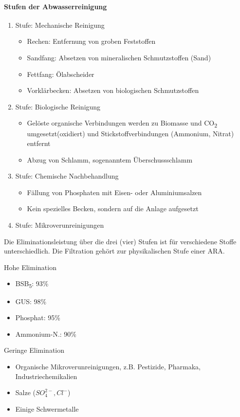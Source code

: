 \documentclass[9pt, openright=false]{scrartcl}
\begin{document}
\paragraph{Stufen der Abwasserreinigung} 
\begin{enumerate}
\item Stufe: Mechanische Reinigung
\begin{itemize}
\item Rechen: Entfernung von groben Feststoffen
\item Sandfang: Absetzen von mineralischen Schmutzstoffen (Sand)
\item Fettfang: Ölabscheider
\item Vorklärbecken: Absetzen von biologischen Schmutzstoffen
\end{itemize}
\item Stufe: Biologische Reinigung
\begin{itemize}
\item Gelöste organische Verbindungen werden zu Biomasse und CO\textsubscript{2} umgesetzt(oxidiert) und Stickstoffverbindungen (Ammonium, Nitrat) entfernt
\item Abzug von Schlamm, sogenanntem \glqq Überschussschlamm\grqq
\end{itemize}
\item Stufe: Chemische Nachbehandlung
\begin{itemize}
\item Fällung von Phosphaten mit Eisen- oder Aluminiumsalzen
\item Kein spezielles Becken, sondern auf die Anlage \glqq aufgesetzt\grqq
\end{itemize}
\item Stufe: Mikroverunreinigungen
\end{enumerate}
Die Eliminationsleistung über die drei (vier) Stufen ist für verschiedene Stoffe unterschiedlich. Die Filtration gehört zur physikalischen Stufe einer ARA.
\begin{multicols}{2}
Hohe Elimination
\begin{itemize}
 \item BSB\textsubscript{5}: 93\%
 \item GUS: 98\%
 \item Phosphat: 95\%
 \item Ammonium-N.: 90\%
\end{itemize}
Geringe Elimination
\begin{itemize}
 \item Organische Mikroverunreinigungen, z.B. Pestizide, Pharmaka, Industriechemikalien
 \item Salze ($SO_4^{2-}, Cl^-$)
 \item Einige Schwermetalle
\end{itemize}
\end{multicols} 
\end{document}
